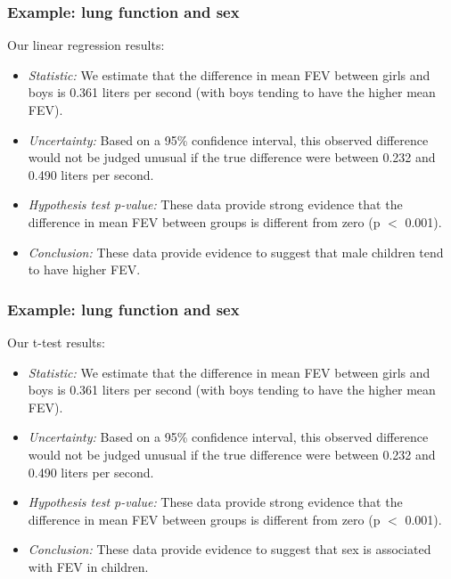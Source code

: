 \documentclass[12pt, 
hyperref={colorlinks=true, linkcolor=blue, urlcolor=cyan}]{beamer}
\begin{document}
\begin{frame}
\frametitle{Example: lung function and sex}

Our linear regression results:

\begin{itemize}
\item \textit{Statistic:} We estimate that the difference in mean FEV between girls and boys is 0.361 liters per second (with boys tending to have the higher mean FEV). \pause
\item \textit{Uncertainty:} Based on a 95\% confidence interval, this observed difference would not be judged unusual if the true difference were between 0.232 and 0.490 liters per second.\pause
\item \textit{Hypothesis test p-value:} These data provide strong evidence that the difference in mean FEV between groups is different from zero (p $<$ 0.001).\pause
\item \textit{Conclusion:} These data provide evidence to suggest that male children tend to have higher FEV.
\end{itemize}

\end{frame}

\begin{frame}
\frametitle{Example: lung function and sex}

Our t-test results: 

\begin{itemize}
\item \textit{Statistic:} We estimate that the difference in mean FEV between girls and boys is 0.361 liters per second (with boys tending to have the higher mean FEV). 
\item \textit{Uncertainty:} Based on a 95\% confidence interval, this observed difference would not be judged unusual if the true difference were between 0.232 and 0.490 liters per second.
\item \textit{Hypothesis test p-value:} These data provide strong evidence that the difference in mean FEV between groups is different from zero (p $<$ 0.001).
\item \textit{Conclusion:} These data provide evidence to suggest that sex is associated with FEV in children.
\end{itemize}

\end{frame}
\end{document}
